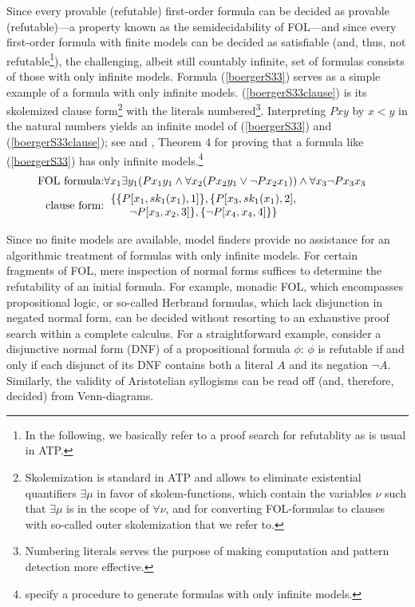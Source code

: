 \documentclass[%
  manuscript=article,   %
  year=2024,
  volume=77,
  doi=10.59203/zfn.77.694,
]{zfn}
\begin{document}
Since every provable (refutable) first-order formula can be decided as provable (refutable)---a property known as the semidecidability of FOL---and since every first-order formula with finite models can be decided as satisfiable (and, thus, not refutable\footnote{In the following, we basically refer to a proof search for refutablity as is usual in ATP.}), the challenging, albeit still countably infinite, set of formulas consists of those with only infinite models. Formula (\ref{boergerS33}) serves as a simple example of a formula with only infinite models. (\ref{boergerS33clause}) is its skolemized clause form\footnote{Skolemization is standard in ATP and allows to eliminate existential quantifiers $\exists \mu$ in favor of skolem-functions, which contain the variables $\nu$ such that $\exists \mu$ is in the scope of $\forall \nu$, \parencite[cf.][chapter 5.5]{Baaz_et_al} and \parencite[][chapter 6.3 and 6.5]{NonnengartWeidenbach} for converting FOL-formulas to clauses with so-called outer skolemization that we refer to.} with the literals numbered\footnote{Numbering literals serves the purpose of making computation and pattern detection more effective.}. Interpreting $Pxy$ by $x<y$ in the natural numbers yields an infinite model of (\ref{boergerS33}) and (\ref{boergerS33clause}); see \parencite[][p. 33]{Boerger_et_al} and \parencite{LampertNakano}, Theorem 4 for proving that a formula like (\ref{boergerS33}) has only infinite models.\footnote{\parencite{LampertNakano} specify a procedure to generate formulas with only infinite models.}
\renewcommand{\arraystretch}{1.25}
\begin{eqnarray}
\mbox{FOL formula:} & \forall x_{1}\exists y_{1} (Px_{1}y_{1} \wedge \forall x_{2}(Px_{2}y_{1} \vee \neg Px_{2}x_{1})) \wedge   \forall x_{3} \neg Px_{3}x_{3} &  \label{boergerS33}\\
\mbox{clause form:} & \begin{tabular}{c}$\{\{P[x_{1}, sk_1(x_{1}), 1]\}, \{P[x_{3}, sk_1(x_{1}), 2],$\\
 $\neg P[x_{3}, x_{2}, 3]\}, \{\neg P[x_{4},x_{4}, 4]\}\}$\end{tabular} &  \label{boergerS33clause}
\end{eqnarray}

Since no finite models are available, model finders provide no assistance for an algorithmic treatment of formulas with only infinite models. For certain fragments of FOL, mere inspection of normal \label{normalforms} forms suffices to determine the refutability of an initial formula. For example, monadic FOL, which encompasses propositional logic, or so-called Herbrand formulas, which lack disjunction in negated normal form, can be decided without resorting to an exhaustive proof search within a complete calculus. For a straightforward example, consider a disjunctive normal form (DNF) of a propositional formula $\phi$: $\phi$ is refutable if and only if each disjunct of its DNF contains both a literal $A$ and its negation $\neg A$. Similarly, the validity of Aristotelian syllogisms can be read off (and, therefore, decided) from Venn-diagrams.
\end{document}
